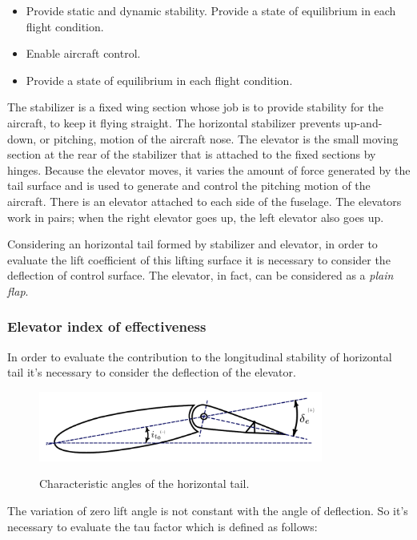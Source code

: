 \begin{itemize}
\item Provide static and dynamic stability.
Provide a state of equilibrium in each flight condition.
\item Enable aircraft control.
\item Provide a state of equilibrium in each flight condition.
\end{itemize}

The stabilizer is a fixed wing section whose job is to provide stability for the aircraft, to keep it flying straight. The horizontal stabilizer prevents up-and-down, or pitching, motion of the aircraft nose. The elevator is the small moving section at the rear of the stabilizer that is attached to the fixed sections by hinges. Because the elevator moves, it varies the amount of force generated by the tail surface and is used to generate and control the pitching motion of the aircraft. There is an elevator attached to each side of the fuselage. The elevators work in pairs; when the right elevator goes up, the left elevator also goes up.

Considering an horizontal tail formed by stabilizer and elevator, in order to evaluate the lift coefficient of this lifting surface it is necessary to consider the deflection of control surface. The elevator, in fact, can be considered as a {\itshape plain flap}.

\subsubsection{Elevator index of effectiveness}
 In order to evaluate the contribution to the longitudinal stability of horizontal tail it's necessary to consider the deflection of the elevator. 
		
\begin{figure}[H]
\centering
{\includegraphics[height=2.3cm]{Immagini/horizontal_tail_profile_deltaE.pdf}} 
\label{htailangle}
\caption{Characteristic angles of the horizontal tail.}
\end{figure} 		
		
The variation of zero lift angle is not constant with the angle of deflection. So it's necessary to evaluate the tau factor which is defined as follows:

